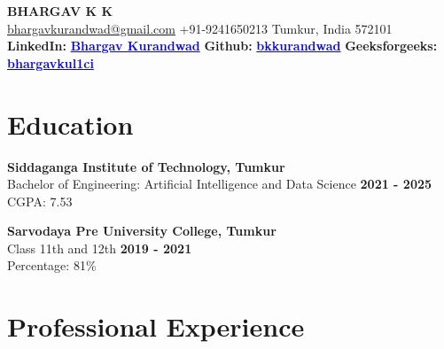 \documentclass[a4paper,11pt]{article}
\begin{document}
\begin{center}
    {\LARGE \textbf{BHARGAV K K}} \\
    \vspace{1mm}
    \href{mailto:bhargavkurandwad@gmail.com}{bhargavkurandwad@gmail.com} \hspace{5mm}
    +91-9241650213 \hspace{5mm}
    Tumkur, India 572101 \\
    \textbf{LinkedIn: }
    \textbf{\href{https://www.linkedin.com/in/bhargav-kurandwad-29a48a137/}
    {\textcolor{blue}{Bhargav Kurandwad}}} \hspace{2mm}
    \textbf{Github: }
    \textbf{\href{https://www.github.com/bkkurandwad }{\textcolor{blue}{bkkurandwad}}} \hspace{2mm}
    \textbf{ Geeksforgeeks: }
    \textbf{\href{https://www.geeksforgeeks.org/user/bhargavkul1ci/ }{\textcolor{blue}{bhargavkul1ci}}}
\end{center}

\vspace{1mm}

\section*{Education}
\vspace{-4pt}
\textbf{Siddaganga Institute of Technology, Tumkur} \\
Bachelor of Engineering: Artificial Intelligence and Data Science \hfill \textbf{2021 - 2025} \\
CGPA: 7.53

\textbf{Sarvodaya Pre University College, Tumkur} \\
Class 11th and 12th \hfill \textbf{2019 - 2021} \\
Percentage: 81\%
\vspace{-2mm}

\section*{Professional Experience}
\vspace{-4pt}
\end{document}
